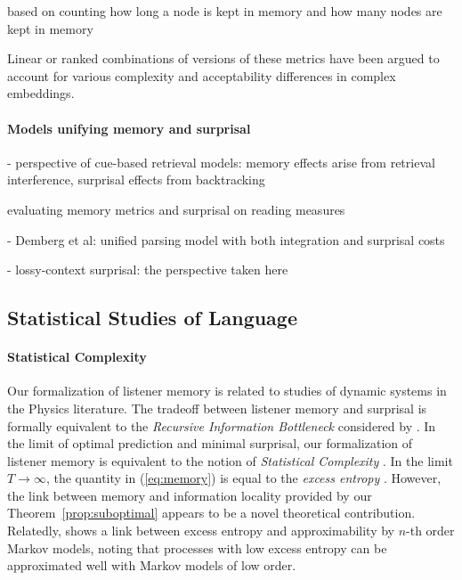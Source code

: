 \cite{kobele2013memory}
\cite{graf2014evaluating}
\cite{GrafEtAl15MOL}
\cite{gerth2015memory}
\cite{GrafEtAl17JLM}
\cite{desanto2020parsing}
based on counting how long a node is kept in memory and how many nodes are kept in memory

Linear or ranked combinations of versions of these metrics have been argued to account for various complexity and acceptability differences in complex embeddings.

\paragraph{Models unifying memory and surprisal}

- perspective of cue-based retrieval models: memory effects arise from retrieval interference, surprisal effects from backtracking

evaluating memory metrics and surprisal on reading measures \cite{boston2008parsing} \cite{demberg2008data} \cite{boston2011parallel}

- Demberg et al: unified parsing model with both integration and surprisal costs \cite{demberg2009computational,demberg2013incremental}

- lossy-context surprisal: the perspective taken here


\subsection{Statistical Studies of Language}

\paragraph{Statistical Complexity}
Our formalization of listener memory is related to studies of dynamic systems in the Physics literature.
The tradeoff between listener memory and surprisal is formally equivalent to the \emph{Recursive Information Bottleneck} considered by \cite{still-information-2014}.
In the limit of optimal prediction and minimal surprisal, our formalization of listener memory is equivalent to the notion of \emph{Statistical Complexity} \citep{crutchfield-inferring-1989}.
In the limit $T \rightarrow \infty$, the quantity in (\ref{eq:memory}) is equal to the \emph{excess entropy} \citep{crutchfield-inferring-1989}.
However, the link between memory and information locality provided by our Theorem~\ref{prop:suboptimal} appears to be a novel theoretical contribution.
Relatedly, \cite{sharan-prediction-2016} shows a link between excess entropy and approximability by $n$-th order Markov models, noting that processes with low excess entropy can be approximated well with Markov models of low order.


